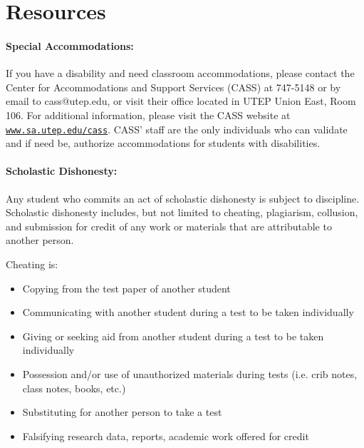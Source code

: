 \documentclass[12pt]{scrartcl}
\begin{document}
\section{Resources}

\paragraph{Special Accommodations: }
If you have a disability and need classroom accommodations, please contact the Center for Accommodations and Support Services (CASS) at 747-5148 or by email to cass@utep.edu, or visit their office located in UTEP Union East, Room 106. For additional information, please visit the CASS website at \href{http://www.sa.utep.edu/cass}{\texttt{www.sa.utep.edu/cass}}. CASS’ staff are the only individuals who can validate and if need be, authorize accommodations for students with disabilities.


\paragraph{Scholastic Dishonesty: }
Any student who commits an act of scholastic dishonesty is subject to discipline. Scholastic dishonesty includes, but not limited to cheating, plagiarism, collusion, and submission for credit of any work or materials that are attributable to another person.

Cheating is:
\begin{itemize}
\item Copying from the test paper of another student
\item Communicating with another student during a test to be taken individually
\item Giving or seeking aid from another student during a test to be taken individually
\item Possession and/or use of unauthorized materials during tests (i.e. crib notes, class notes, books, etc.)
\item Substituting for another person to take a test
\item Falsifying research data, reports, academic work offered for credit
\end{itemize}
\end{document}
